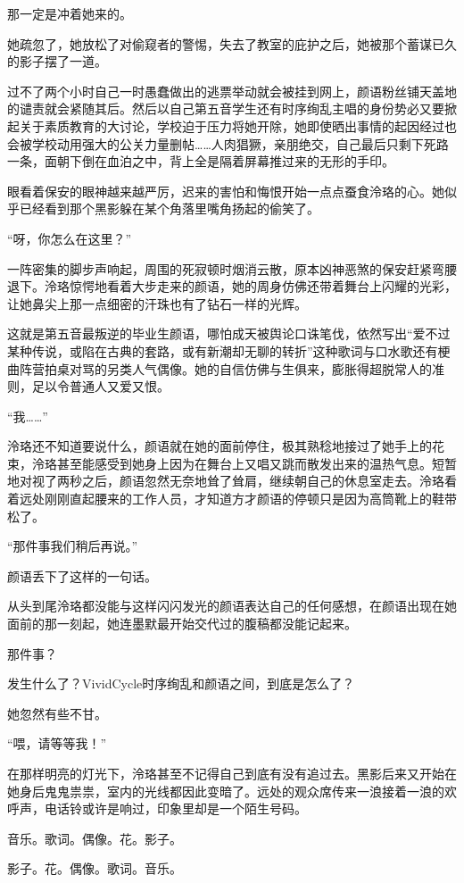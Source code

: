 \documentclass[UTF8, scheme = chinese, openany]{ctexbook}
\begin{document}
那一定是冲着她来的。

她疏忽了，她放松了对偷窥者的警惕，失去了教室的庇护之后，她被那个蓄谋已久的影子摆了一道。

过不了两个小时自己一时愚蠢做出的逃票举动就会被挂到网上，颜语粉丝铺天盖地的谴责就会紧随其后。然后以自己第五音学生还有时序绚乱主唱的身份势必又要掀起关于素质教育的大讨论，学校迫于压力将她开除，她即使晒出事情的起因经过也会被学校动用强大的公关力量删帖……人肉猖獗，亲朋绝交，自己最后只剩下死路一条，面朝下倒在血泊之中，背上全是隔着屏幕推过来的无形的手印。

眼看着保安的眼神越来越严厉，迟来的害怕和悔恨开始一点点蚕食泠珞的心。她似乎已经看到那个黑影躲在某个角落里嘴角扬起的偷笑了。

“呀，你怎么在这里？”

一阵密集的脚步声响起，周围的死寂顿时烟消云散，原本凶神恶煞的保安赶紧弯腰退下。泠珞惊愕地看着大步走来的颜语，她的周身仿佛还带着舞台上闪耀的光彩，让她鼻尖上那一点细密的汗珠也有了钻石一样的光辉。

这就是第五音最叛逆的毕业生颜语，哪怕成天被舆论口诛笔伐，依然写出“爱不过某种传说，或陷在古典的套路，或有新潮却无聊的转折”这种歌词与口水歌还有梗曲阵营拍桌对骂的另类人气偶像。她的自信仿佛与生俱来，膨胀得超脱常人的准则，足以令普通人又爱又恨。

“我……”

泠珞还不知道要说什么，颜语就在她的面前停住，极其熟稔地接过了她手上的花束，泠珞甚至能感受到她身上因为在舞台上又唱又跳而散发出来的温热气息。短暂地对视了两秒之后，颜语忽然无奈地耸了耸肩，继续朝自己的休息室走去。泠珞看着远处刚刚直起腰来的工作人员，才知道方才颜语的停顿只是因为高筒靴上的鞋带松了。

“那件事我们稍后再说。”

颜语丢下了这样的一句话。

从头到尾泠珞都没能与这样闪闪发光的颜语表达自己的任何感想，在颜语出现在她面前的那一刻起，她连墨默最开始交代过的腹稿都没能记起来。

那件事？

发生什么了？VividCycle时序绚乱和颜语之间，到底是怎么了？

她忽然有些不甘。

“喂，请等等我！”

在那样明亮的灯光下，泠珞甚至不记得自己到底有没有追过去。黑影后来又开始在她身后鬼鬼祟祟，室内的光线都因此变暗了。远处的观众席传来一浪接着一浪的欢呼声，电话铃或许是响过，印象里却是一个陌生号码。

音乐。歌词。偶像。花。影子。

影子。花。偶像。歌词。音乐。
\end{document}
